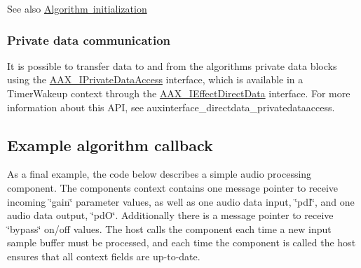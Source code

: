  \begin{DoxySeeAlso}{See also}
\mbox{\hyperlink{a00797_alg_initialization}{Algorithm initialization}}
\end{DoxySeeAlso}
\hypertarget{a00797_alg_pd_comm}{}\subsubsection{Private data communication}\label{a00797_alg_pd_comm}
 It is possible to transfer data to and from the algorithm\textquotesingle{}s private data blocks using the \mbox{\hyperlink{a01865}{A\+A\+X\+\_\+\+I\+Private\+Data\+Access}} interface, which is available in a Timer\+Wakeup context through the \mbox{\hyperlink{a01817}{A\+A\+X\+\_\+\+I\+Effect\+Direct\+Data}} interface. For more information about this A\+PI, see auxinterface\+\_\+directdata\+\_\+privatedataaccess.



 \hypertarget{a00797_alg_examp}{}\subsection{Example algorithm callback}\label{a00797_alg_examp}
 As a final example, the code below describes a simple audio processing component. The component\textquotesingle{}s context contains one message pointer to receive incoming \char`\"{}gain\char`\"{} parameter values, as well as one audio data input, \char`\"{}pd\+I\char`\"{}, and one audio data output, \char`\"{}pd\+O\char`\"{}. Additionally there is a message pointer to receive \char`\"{}bypass\char`\"{} on/off values. The host calls the component each time a new input sample buffer must be processed, and each time the component is called the host ensures that all context fields are up-\/to-\/date.



